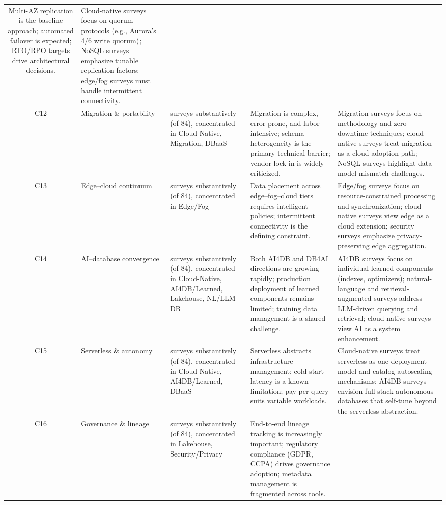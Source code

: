 \documentclass[a4paper,fleqn]{cas-sc}
\begin{document}
\begin{landscape}
\begin{small}
\begin{longtable}{c >{\raggedright\arraybackslash}p{2.2cm} >{\raggedright\arraybackslash}p{2.5cm} >{\raggedright\arraybackslash}p{7.2cm} >{\raggedright\arraybackslash}p{7.2cm}}
Multi-AZ replication is the baseline approach; automated failover is expected; RTO/RPO targets drive architectural decisions. &
Cloud-native surveys focus on quorum protocols (e.g., Aurora's 4/6 write quorum); NoSQL surveys emphasize tunable replication factors; edge/fog surveys must handle intermittent connectivity. \\
\addlinespace
C12 & Migration \& portability &
14 surveys substantively (of 84), concentrated in Cloud-Native, Migration, DBaaS &
Migration is complex, error-prone, and labor-intensive; schema heterogeneity is the primary technical barrier; vendor lock-in is widely criticized. &
Migration surveys focus on methodology and zero-downtime techniques; cloud-native surveys treat migration as a cloud adoption path; NoSQL surveys highlight data model mismatch challenges. \\
\addlinespace
C13 & Edge--cloud continuum &
7 surveys substantively (of 84), concentrated in Edge/Fog &
Data placement across edge--fog--cloud tiers requires intelligent policies; intermittent connectivity is the defining constraint. &
Edge/fog surveys focus on resource-constrained processing and synchronization; cloud-native surveys view edge as a cloud extension; security surveys emphasize privacy-preserving edge aggregation. \\
\addlinespace
C14 & AI--database convergence &
31 surveys substantively (of 84), concentrated in Cloud-Native, AI4DB/Learned, Lakehouse, NL/LLM--DB &
Both AI4DB and DB4AI directions are growing rapidly; production deployment of learned components remains limited; training data management is a shared challenge. &
AI4DB surveys focus on individual learned components (indexes, optimizers); natural-language and retrieval-augmented surveys address LLM-driven querying and retrieval; cloud-native surveys view AI as a system enhancement. \\
\addlinespace
C15 & Serverless \& autonomy &
10 surveys substantively (of 84), concentrated in Cloud-Native, AI4DB/Learned, DBaaS &
Serverless abstracts infrastructure management; cold-start latency is a known limitation; pay-per-query suits variable workloads. &
Cloud-native surveys treat serverless as one deployment model and catalog autoscaling mechanisms; AI4DB surveys envision full-stack autonomous databases that self-tune beyond the serverless abstraction. \\
\addlinespace
C16 & Governance \& lineage &
10 surveys substantively (of 84), concentrated in Lakehouse, Security/Privacy &
End-to-end lineage tracking is increasingly important; regulatory compliance (GDPR, CCPA) drives governance adoption; metadata management is fragmented across tools. &

\end{longtable}
\end{small}
\end{landscape}
\end{document}
